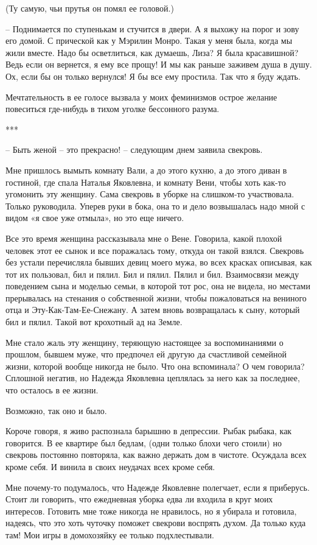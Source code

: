 \documentclass[
]{book}
\begin{document}
(Ту самую, чьи прутья он помял ее головой.)

-- Поднимается по ступенькам и стучится в двери. А я выхожу на порог и зову его домой. С прической как у Мэрилин Монро. Такая у меня была, когда мы жили вместе. Надо бы осветлиться, как думаешь, Лиза? Я была красавишной? Ведь если он вернется, я ему все прощу! И мы как раньше заживем душа в душу. Ох, если бы он только вернулся! Я бы все ему простила. Так что я буду ждать.

Мечтательность в ее голосе вызвала у моих феминизмов острое желание повеситься где-нибудь в тихом уголке бессонного разума.

***

-- Быть женой -- это прекрасно! -- следующим днем заявила свекровь.

Мне пришлось вымыть комнату Вали, а до этого кухню, а до этого диван в гостиной, где спала Наталья Яковлевна, и комнату Вени, чтобы хоть как-то угомонить эту женщину. Сама свекровь в уборке на слишком-то участвовала. Только руководила. Уперев руки в бока, она то и дело возвышалась надо мной с видом «я свое уже отмыла», но это еще ничего.

Все это время женщина рассказывала мне о Вене. Говорила, какой плохой человек этот ее сынок и все поражалась тому, откуда он такой взялся. Свекровь без устали перечисляла бывших девиц моего мужа, во всех красках описывая, как тот их пользовал, бил и пялил. Бил и пялил. Пялил и бил. Взаимосвязи между поведением сына и моделью семьи, в которой тот рос, она не видела, но местами прерывалась на стенания о собственной жизни, чтобы пожаловаться на вениного отца и Эту-Как-Там-Ее-Снежану. А затем вновь возвращалась к сыну, который бил и пялил. Такой вот крохотный ад на Земле.

Мне стало жаль эту женщину, теряющую настоящее за воспоминаниями о прошлом, бывшем муже, что предпочел ей другую да счастливой семейной жизни, которой вообще никогда не было. Что она вспоминала? О чем говорила? Сплошной негатив, но Надежда Яковлевна цеплялась за него как за последнее, что осталось в ее жизни.

Возможно, так оно и было.

Короче говоря, я живо распознала барышню в депрессии. Рыбак рыбака, как говорится. В ее квартире был бедлам, (одни только блохи чего стоили) но свекровь постоянно повторяла, как важно держать дом в чистоте. Осуждала всех кроме себя. И винила в своих неудачах всех кроме себя.

Мне почему-то подумалось, что Надежде Яковлевне полегчает, если я приберусь. Стоит ли говорить, что ежедневная уборка едва ли входила в круг моих интересов. Готовить мне тоже никогда не нравилось, но я убирала и готовила, надеясь, что это хоть чуточку поможет свекрови воспрять духом. Да только куда там! Мои игры в домохозяйку ее только подхлестывали.
\end{document}
